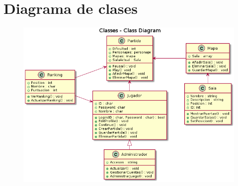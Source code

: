\section{Diagrama de clases}\label{sec:uc}




  \begin{figure}[ht]
  \centering
  \includegraphics[width=1\textwidth]{./imatges/Diagrama Clases.png}
  \label{fig:usecase}
   \end{figure}
   